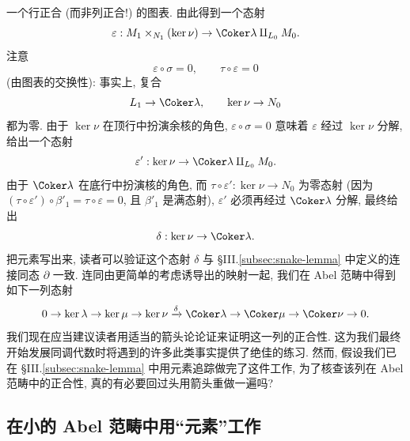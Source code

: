 \begin{center}
\end{center}
一个行正合 (而非列正合!) 的图表. 由此得到一个态射
\[
\varepsilon: M_1\times_{N_1}(\ker\nu)\to \Coker\lambda\amalg_{L_0}M_0.
\]
注意
\[
\varepsilon\circ\sigma=0,\qquad \tau\circ\varepsilon=0
\]
(由图表的交换性): 事实上, 复合
\[
L_1\to\Coker\lambda,\qquad \ker\nu\to N_0
\]
都为零. 由于 $\ker\nu$ 在顶行中扮演余核的角色, $\varepsilon\circ\sigma=0$ 意味着 $\varepsilon$ 经过 $\ker\nu$ 分解, 给出一个态射
\[
\varepsilon':\ker\nu\to \Coker\lambda\amalg_{L_0}M_0.
\]
由于 $\Coker\lambda$ 在底行中扮演核的角色, 而 $\tau\circ\varepsilon':\ker\nu\to N_0$ 为零态射 (因为 $(\tau\circ\varepsilon')\circ\beta'_1=\tau\circ\varepsilon=0$, 且 $\beta'_1$ 是满态射), $\varepsilon'$ 必须再经过 $\Coker\lambda$ 分解, 最终给出
\[
\delta:\ker\nu\to\Coker\lambda.
\]
把元素写出来, 读者可以验证这个态射 $\delta$ 与 §III.\ref{subsec:snake-lemma} 中定义的连接同态 $\partial$ 一致. 连同由更简单的考虑诱导出的映射一起, 我们在 Abel 范畴中得到如下一列态射
\[
0\to\ker\lambda\to\ker\mu\to\ker\nu\xrightarrow{\delta}\Coker\lambda\to\Coker\mu\to\Coker\nu\to 0.
\]
我们现在应当建议读者用适当的箭头论论证来证明这一列的正合性. 这为我们最终开始发展同调代数时将遇到的许多此类事实提供了绝佳的练习.
然而, 假设我们已在 §III.\ref{subsec:snake-lemma} 中用元素追踪做完了这件工作, 为了核查该列在 Abel 范畴中的正合性, 真的有必要回过头用箭头重做一遍吗?

\subsection{在小的 Abel 范畴中用``元素''工作}
\label{subsec:working-with-elements}

